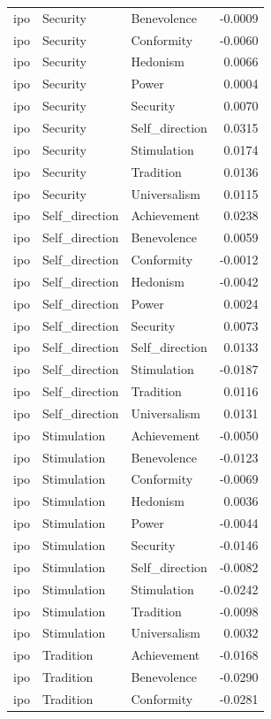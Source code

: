 \begin{tabular}{lllr}
ipo & Security & Benevolence & -0.0009 \\
ipo & Security & Conformity & -0.0060 \\
ipo & Security & Hedonism & 0.0066 \\
ipo & Security & Power & 0.0004 \\
ipo & Security & Security & 0.0070 \\
ipo & Security & Self\_direction & 0.0315 \\
ipo & Security & Stimulation & 0.0174 \\
ipo & Security & Tradition & 0.0136 \\
ipo & Security & Universalism & 0.0115 \\
ipo & Self\_direction & Achievement & 0.0238 \\
ipo & Self\_direction & Benevolence & 0.0059 \\
ipo & Self\_direction & Conformity & -0.0012 \\
ipo & Self\_direction & Hedonism & -0.0042 \\
ipo & Self\_direction & Power & 0.0024 \\
ipo & Self\_direction & Security & 0.0073 \\
ipo & Self\_direction & Self\_direction & 0.0133 \\
ipo & Self\_direction & Stimulation & -0.0187 \\
ipo & Self\_direction & Tradition & 0.0116 \\
ipo & Self\_direction & Universalism & 0.0131 \\
ipo & Stimulation & Achievement & -0.0050 \\
ipo & Stimulation & Benevolence & -0.0123 \\
ipo & Stimulation & Conformity & -0.0069 \\
ipo & Stimulation & Hedonism & 0.0036 \\
ipo & Stimulation & Power & -0.0044 \\
ipo & Stimulation & Security & -0.0146 \\
ipo & Stimulation & Self\_direction & -0.0082 \\
ipo & Stimulation & Stimulation & -0.0242 \\
ipo & Stimulation & Tradition & -0.0098 \\
ipo & Stimulation & Universalism & 0.0032 \\
ipo & Tradition & Achievement & -0.0168 \\
ipo & Tradition & Benevolence & -0.0290 \\
ipo & Tradition & Conformity & -0.0281 \\

\end{tabular}
